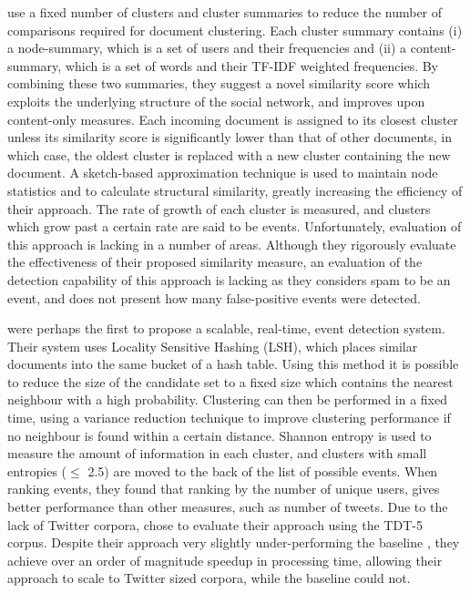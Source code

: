\cite{aggarwalevent} use a fixed number of clusters and cluster summaries to reduce the number of comparisons required for document clustering. Each cluster summary contains (i) a node-summary, which is a set of users and their frequencies and (ii) a content-summary, which is a set of words and their TF-IDF \cite{Salton:1988:TAA:54259.54260} weighted frequencies. By combining these two summaries, they suggest a novel similarity score which exploits the underlying structure of the social network, and improves upon content-only measures. Each incoming document is assigned to its closest cluster unless its similarity score is significantly lower than that of other documents, in which case, the oldest cluster is replaced with a new cluster containing  the new document. A sketch-based approximation technique is used to maintain node statistics and to calculate structural similarity, greatly increasing the efficiency of their approach. The rate of growth of each cluster is measured, and clusters which grow past a certain rate are said to be events. Unfortunately, evaluation of this approach is lacking in a number of areas. Although they rigorously evaluate the effectiveness of their proposed similarity measure, an evaluation of the detection capability of this approach is lacking as they considers spam to be an event, and does not present how many false-positive events were detected.

\cite{Petrovic:2010:SFS:1857999.1858020} were perhaps the first to propose a scalable, real-time, event detection system. Their system uses Locality Sensitive Hashing (LSH), which places similar documents into the same bucket of a hash table. Using this method it is possible to reduce the size of the candidate set to a fixed size which contains the nearest neighbour with a high probability. Clustering can then be performed in a fixed time, using a variance reduction technique \cite{Petrovic:2010:SFS:1857999.1858020} to improve clustering performance if no neighbour is found within a certain distance. Shannon entropy\citep{Shannon:2001:MTC:584091.584093} is used to measure the amount of information in each cluster, and clusters with small entropies (\(\le\) 2.5) are moved to the back of the list of possible events. When ranking events, they found that ranking by the number of unique users, gives better performance than other measures, such as number of tweets. Due to the lack of Twitter corpora, \cite{Petrovic:2010:SFS:1857999.1858020} chose to evaluate their approach using the TDT-5 corpus. Despite their approach very slightly under-performing the baseline \citep{UMASS}, they achieve over an order of magnitude speedup in processing time, allowing their approach to scale to Twitter sized corpora, while the baseline could not.

